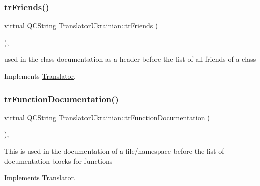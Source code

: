 \mbox{\label{class_translator_ukrainian_a17f4e8569e34338c21c72315eb48f0f8}} 
\subsubsection{\texorpdfstring{trFriends()}{trFriends()}}
{\footnotesize\ttfamily virtual \mbox{\hyperlink{class_q_c_string}{Q\+C\+String}} Translator\+Ukrainian\+::tr\+Friends (\begin{DoxyParamCaption}{ }\end{DoxyParamCaption})\hspace{0.3cm}{\ttfamily [inline]}, {\ttfamily [virtual]}}

used in the class documentation as a header before the list of all friends of a class 

Implements \mbox{\hyperlink{class_translator}{Translator}}.

\mbox{\label{class_translator_ukrainian_aa6cd7cd39f4983f398daaab1174c494b}} 
\subsubsection{\texorpdfstring{trFunctionDocumentation()}{trFunctionDocumentation()}}
{\footnotesize\ttfamily virtual \mbox{\hyperlink{class_q_c_string}{Q\+C\+String}} Translator\+Ukrainian\+::tr\+Function\+Documentation (\begin{DoxyParamCaption}{ }\end{DoxyParamCaption})\hspace{0.3cm}{\ttfamily [inline]}, {\ttfamily [virtual]}}

This is used in the documentation of a file/namespace before the list of documentation blocks for functions 

Implements \mbox{\hyperlink{class_translator}{Translator}}.

\mbox{\label{class_translator_ukrainian_a84777a6e77683a7c3d9e297964bfc070}} 

